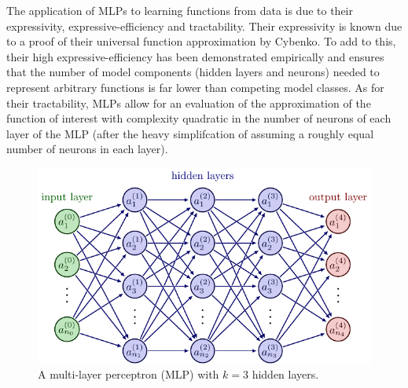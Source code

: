 \documentclass[11pt]{article}
\begin{document}
The application of MLPs to learning functions from data is due to their expressivity, expressive-efficiency and tractability. Their expressivity is known due to a proof of their universal function approximation by Cybenko. To add to this, their high expressive-efficiency has been demonstrated empirically and ensures that the number of model components (hidden layers and neurons) needed to represent arbitrary functions is far lower than competing model classes. As for their tractability, MLPs allow for an evaluation of the approximation of the function of interest with complexity quadratic in the number of neurons of each layer of the MLP (after the heavy simplifcation of assuming a roughly equal number of neurons in each layer).

\begin{figure}[t]
    \centering
    \includegraphics[width=1\linewidth]{./figures/neural_nets/MLP_1.pdf}
    \caption{A multi-layer perceptron (MLP) with $k=3$ hidden layers.}
    \label{fig:MLP}
\end{figure}
\end{document}

